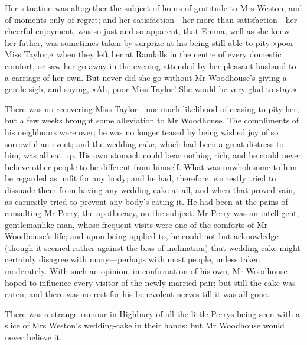 Her situation was altogether the subject of hours of gratitude to Mrs Weston, and of moments only of regret; and her satisfaction—her more than satisfaction—her cheerful enjoyment, was so just and so apparent, that Emma, well as she knew her father, was sometimes taken by surprize at his being still able to pity »poor Miss Taylor,« when they left her at Randalls in the centre of every domestic comfort, or saw her go away in the evening attended by her pleasant husband to a carriage of her own. But never did she go without Mr Woodhouse's giving a gentle sigh, and saying, »Ah, poor Miss Taylor! She would be very glad to stay.«

There was no recovering Miss Taylor—nor much likelihood of ceasing to pity her; but a few weeks brought some alleviation to Mr Woodhouse. The compliments of his neighbours were over; he was no longer teased by being wished joy of so sorrowful an event; and the wedding-cake, which had been a great distress to him, was all eat up. His own stomach could bear nothing rich, and he could never believe other people to be different from himself. What was unwholesome to him he regarded as unfit for any body; and he had, therefore, earnestly tried to dissuade them from having any wedding-cake at all, and when that proved vain, as earnestly tried to prevent any body's eating it. He had been at the pains of consulting Mr Perry, the apothecary, on the subject. Mr Perry was an intelligent, gentlemanlike man, whose frequent visits were one of the comforts of Mr Woodhouse's life; and upon being applied to, he could not but acknowledge (though it seemed rather against the bias of inclination) that wedding-cake might certainly disagree with many—perhaps with most people, unless taken moderately. With such an opinion, in confirmation of his own, Mr Woodhouse hoped to influence every visitor of the newly married pair; but still the cake was eaten; and there was no rest for his benevolent nerves till it was all gone.




There was a strange rumour in Highbury of all the little Perrys being seen with a slice of Mrs Weston's wedding-cake in their hands: but Mr Woodhouse would never believe it.